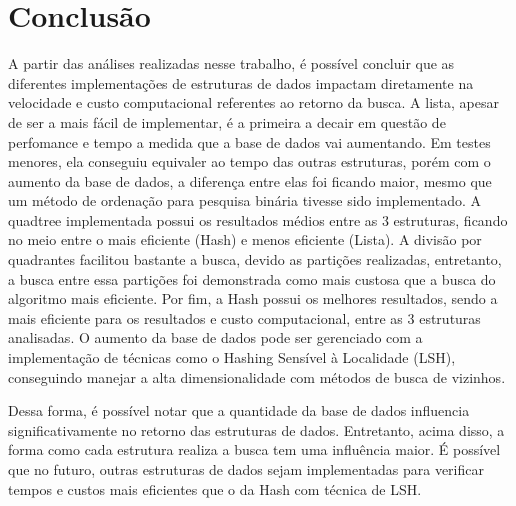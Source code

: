 \documentclass{sbc2023}%
\begin{document}
\section{Conclusão}
A partir das análises realizadas nesse trabalho, é possível concluir que as diferentes implementações de estruturas de dados impactam diretamente na velocidade e custo computacional referentes ao retorno da busca. A lista, apesar de ser a mais fácil de implementar, é a primeira a decair em questão de perfomance e tempo a medida que a base de dados vai aumentando. Em testes menores, ela conseguiu equivaler ao tempo das outras estruturas, porém com o aumento da base de dados, a diferença entre elas foi ficando maior, mesmo que um método de ordenação para pesquisa binária tivesse sido implementado. A quadtree implementada possui os resultados médios entre as 3 estruturas, ficando no meio entre o mais eficiente (Hash) e menos eficiente (Lista). A divisão por quadrantes facilitou bastante a busca, devido as partições realizadas, entretanto, a busca entre essa partições foi demonstrada como mais custosa que a busca do algoritmo mais eficiente. Por fim, a Hash possui os melhores resultados, sendo a mais eficiente para os resultados e custo computacional, entre as 3 estruturas analisadas. O aumento da base de dados pode ser gerenciado com a implementação de técnicas como o Hashing Sensível à Localidade (LSH), conseguindo manejar a alta dimensionalidade com métodos de busca de vizinhos.

Dessa forma, é possível notar que a quantidade da base de dados influencia significativamente no retorno das estruturas de dados. Entretanto, acima disso, a forma como cada estrutura realiza a busca tem uma influência maior. É possível que no futuro, outras estruturas de dados sejam implementadas para verificar tempos e custos mais eficientes que o da Hash com técnica de LSH.


\end{document}
